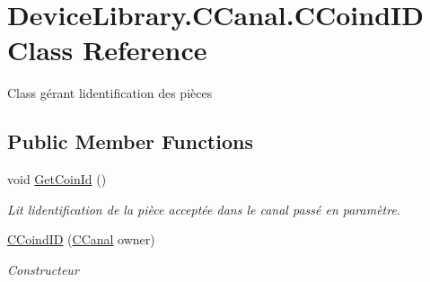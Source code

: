 \hypertarget{class_device_library_1_1_c_canal_1_1_c_coind_i_d}{}\section{Device\+Library.\+C\+Canal.\+C\+Coind\+ID Class Reference}
\label{class_device_library_1_1_c_canal_1_1_c_coind_i_d}


Class gérant l\textquotesingle{}identification des pièces  


\subsection*{Public Member Functions}
\begin{DoxyCompactItemize}
\item 
void \mbox{\hyperlink{class_device_library_1_1_c_canal_1_1_c_coind_i_d_ab5613c7ed033e568c1b3963780f152b8}{Get\+Coin\+Id}} ()
\begin{DoxyCompactList}\small\item\em Lit l\textquotesingle{}identification de la pièce acceptée dans le canal passé en paramètre. \end{DoxyCompactList}\item 
\mbox{\hyperlink{class_device_library_1_1_c_canal_1_1_c_coind_i_d_ac2a7783bef16f50936b86c40cf9d6b73}{C\+Coind\+ID}} (\mbox{\hyperlink{class_device_library_1_1_c_canal}{C\+Canal}} owner)
\begin{DoxyCompactList}\small\item\em Constructeur \end{DoxyCompactList}\end{DoxyCompactItemize}
